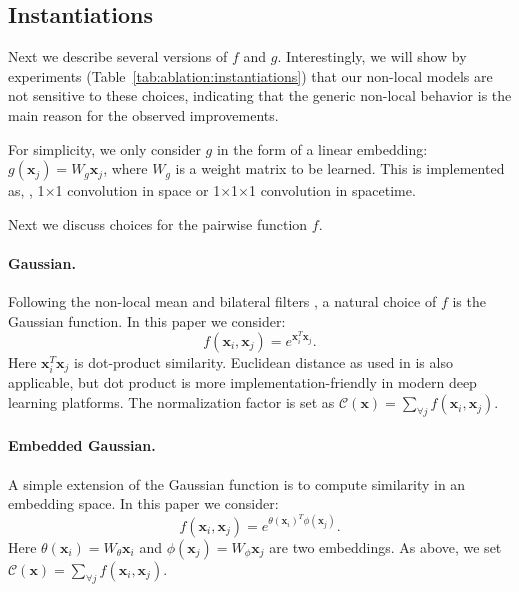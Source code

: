 \documentclass[10pt,twocolumn,letterpaper]{article}
\newcommand{\ve}[1]{\mathbf{#1}} %
\def\x{$\times$}
\begin{document}
\subsection{Instantiations}\label{sec:instantiations}
\vspace{-.2em}
Next we describe several versions of $f$ and $g$. Interestingly, we will show by experiments (Table~\ref{tab:ablation:instantiations}) that our non-local models are not sensitive to these choices, indicating that the generic non-local behavior is the main reason for the observed improvements.

For simplicity, we only consider $g$ in the form of a linear embedding: $g(\ve{x}_j)=W_g\ve{x}_j$, where $W_g$ is a weight matrix to be learned. This is implemented as, \eg, 1\x1 convolution in space or 1\x1\x1 convolution in spacetime.

Next we discuss choices for the pairwise function $f$.

\paragraph{Gaussian.} Following the non-local mean \cite{Buades2005} and bilateral filters \cite{Tomasi1998}, a natural choice of $f$ is the Gaussian function. In this paper we consider:
\begin{equation}\label{eq:gaussian}
f(\ve{x}_i, \ve{x}_j) = e^{\ve{x}_i^T\ve{x}_j}.
\end{equation}
Here $\ve{x}_i^T\ve{x}_j$ is dot-product similarity. Euclidean distance as used in \cite{Buades2005,Tomasi1998} is also applicable, but dot product is more implementation-friendly in modern deep learning platforms. The normalization factor is set as $\mathcal{C}(\ve{x})=\sum_{\forall j}f(\ve{x}_i, \ve{x}_j)$.

\paragraph{Embedded Gaussian.} A simple extension of the Gaussian function is to compute similarity in an embedding space. In this paper we consider:
\begin{equation}\label{eq:gaussian_emb}
f(\ve{x}_i, \ve{x}_j) = e^{\theta(\ve{x}_i)^T\phi(\ve{x}_j)}.
\end{equation}
Here $\theta(\ve{x}_i)=W_\theta\ve{x}_i$ and $\phi(\ve{x}_j)=W_\phi\ve{x}_j$ are two embeddings. As above, we set $\mathcal{C}(\ve{x})=\sum_{\forall j}f(\ve{x}_i, \ve{x}_j)$.
\end{document}
